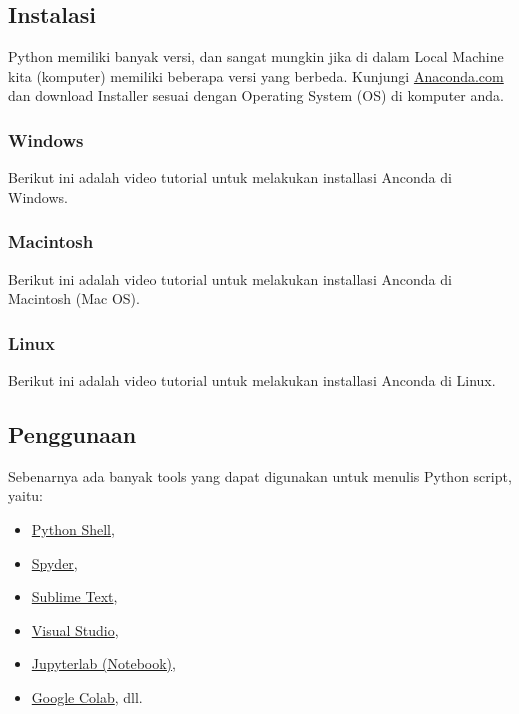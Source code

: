 \documentclass[
]{docs}
\providecommand{\tightlist}{%
  \setlength{\itemsep}{0pt}\setlength{\parskip}{0pt}}
\begin{document}
\hypertarget{instalasi}{%
\subsection{Instalasi}\label{instalasi}}

Python memiliki banyak versi, dan sangat mungkin jika di dalam Local Machine kita (komputer) memiliki beberapa versi yang berbeda. Kunjungi \href{https://www.anaconda.com/products/distribution}{Anaconda.com} dan download Installer sesuai dengan Operating System (OS) di komputer anda.

\hypertarget{windows}{%
\subsubsection{Windows}\label{windows}}

Berikut ini adalah video tutorial untuk melakukan installasi Anconda di Windows.

\hypertarget{macintosh}{%
\subsubsection{Macintosh}\label{macintosh}}

Berikut ini adalah video tutorial untuk melakukan installasi Anconda di Macintosh (Mac OS).

\hypertarget{linux}{%
\subsubsection{Linux}\label{linux}}

Berikut ini adalah video tutorial untuk melakukan installasi Anconda di Linux.

\hypertarget{penggunaan}{%
\subsection{Penggunaan}\label{penggunaan}}

Sebenarnya ada banyak tools yang dapat digunakan untuk menulis Python script, yaitu:

\begin{itemize}
\tightlist
\item
  \href{https://www.python.org/shell/}{Python Shell},
\item
  \href{https://www.spyder-ide.org/}{Spyder},
\item
  \href{https://www.sublimetext.com/}{Sublime Text},
\item
  \href{https://visualstudio.microsoft.com/vs/features/python/}{Visual Studio},
\item
  \href{https://jupyter.org/}{Jupyterlab (Notebook)},
\item
  \href{https://colab.research.google.com/?hl=id}{Google Colab}, dll.
\end{itemize}
\end{document}
